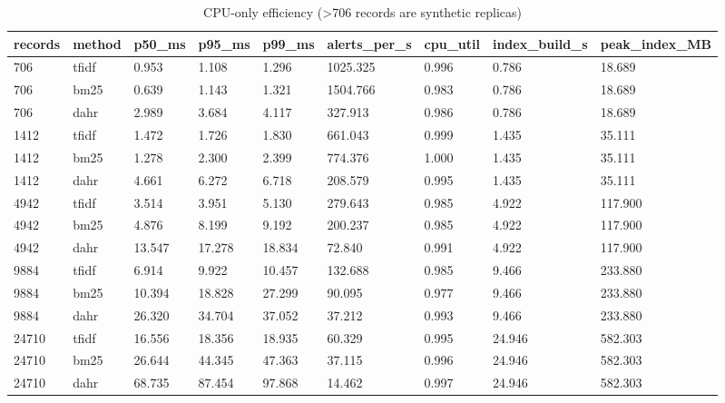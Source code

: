 \begin{table}[t]\centering\caption{CPU-only efficiency (>706 records are synthetic replicas)}
\begin{tabular}{lllllllll}\hline
records & method & p50\_ms & p95\_ms & p99\_ms & alerts\_per\_s & cpu\_util & index\_build\_s & peak\_index\_MB \\\hline
706 & tfidf & 0.953 & 1.108 & 1.296 & 1025.325 & 0.996 & 0.786 & 18.689 \\
706 & bm25 & 0.639 & 1.143 & 1.321 & 1504.766 & 0.983 & 0.786 & 18.689 \\
706 & dahr & 2.989 & 3.684 & 4.117 & 327.913 & 0.986 & 0.786 & 18.689 \\
1412 & tfidf & 1.472 & 1.726 & 1.830 & 661.043 & 0.999 & 1.435 & 35.111 \\
1412 & bm25 & 1.278 & 2.300 & 2.399 & 774.376 & 1.000 & 1.435 & 35.111 \\
1412 & dahr & 4.661 & 6.272 & 6.718 & 208.579 & 0.995 & 1.435 & 35.111 \\
4942 & tfidf & 3.514 & 3.951 & 5.130 & 279.643 & 0.985 & 4.922 & 117.900 \\
4942 & bm25 & 4.876 & 8.199 & 9.192 & 200.237 & 0.985 & 4.922 & 117.900 \\
4942 & dahr & 13.547 & 17.278 & 18.834 & 72.840 & 0.991 & 4.922 & 117.900 \\
9884 & tfidf & 6.914 & 9.922 & 10.457 & 132.688 & 0.985 & 9.466 & 233.880 \\
9884 & bm25 & 10.394 & 18.828 & 27.299 & 90.095 & 0.977 & 9.466 & 233.880 \\
9884 & dahr & 26.320 & 34.704 & 37.052 & 37.212 & 0.993 & 9.466 & 233.880 \\
24710 & tfidf & 16.556 & 18.356 & 18.935 & 60.329 & 0.995 & 24.946 & 582.303 \\
24710 & bm25 & 26.644 & 44.345 & 47.363 & 37.115 & 0.996 & 24.946 & 582.303 \\
24710 & dahr & 68.735 & 87.454 & 97.868 & 14.462 & 0.997 & 24.946 & 582.303 \\
\hline\end{tabular}\end{table}
